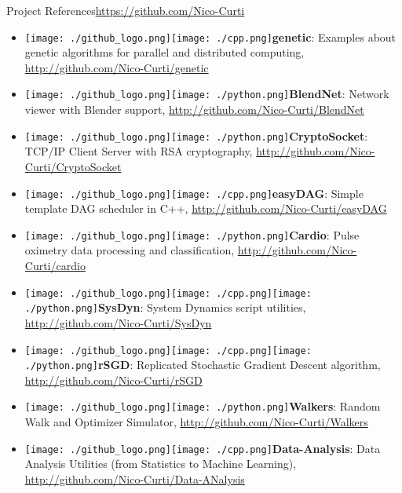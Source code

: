 \documentclass[10pt, technote, oribibl, unicode]{beamer}
\begin{document}
\begin{frame}{Project References}{\url{https://github.com/Nico-Curti}}
\begin{itemize}
    \item[] \texttt{[image: ./github\_logo.png]}\quad\texttt{[image: ./cpp.png]}\quad \textbf{genetic}: Examples about genetic algorithms for parallel and distributed computing, \url{http://github.com/Nico-Curti/genetic}

    \item[] \texttt{[image: ./github\_logo.png]}\quad\texttt{[image: ./python.png]}\quad \textbf{BlendNet}: Network viewer with Blender support, \url{http://github.com/Nico-Curti/BlendNet}

    \item[] \texttt{[image: ./github\_logo.png]}\quad\texttt{[image: ./python.png]}\quad \textbf{CryptoSocket}: TCP/IP Client Server with RSA cryptography, \url{http://github.com/Nico-Curti/CryptoSocket}

    \item[] \texttt{[image: ./github\_logo.png]}\quad\texttt{[image: ./cpp.png]}\quad \textbf{easyDAG}: Simple template DAG scheduler in C++, \url{http://github.com/Nico-Curti/easyDAG}

    \item[] \texttt{[image: ./github\_logo.png]}\quad\texttt{[image: ./python.png]}\quad \textbf{Cardio}: Pulse oximetry data processing and classification, \url{http://github.com/Nico-Curti/cardio}

    \item[] \texttt{[image: ./github\_logo.png]}\quad\texttt{[image: ./cpp.png]}\quad\texttt{[image: ./python.png]}\quad \textbf{SysDyn}: System Dynamics script utilities, \url{http://github.com/Nico-Curti/SysDyn}

    \item[] \texttt{[image: ./github\_logo.png]}\quad\texttt{[image: ./cpp.png]}\quad\texttt{[image: ./python.png]}\quad \textbf{rSGD}: Replicated Stochastic Gradient Descent algorithm, \url{http://github.com/Nico-Curti/rSGD}


    \item[] \texttt{[image: ./github\_logo.png]}\quad\texttt{[image: ./python.png]}\quad \textbf{Walkers}: Random Walk and Optimizer Simulator, \url{http://github.com/Nico-Curti/Walkers}

    \item[] \texttt{[image: ./github\_logo.png]}\quad\texttt{[image: ./cpp.png]}\quad \textbf{Data-Analysis}: Data Analysis Utilities (from Statistics to Machine Learning), \url{http://github.com/Nico-Curti/Data-ANalysis}

  \end{itemize}

\end{frame}

\makethanks
\end{document}
